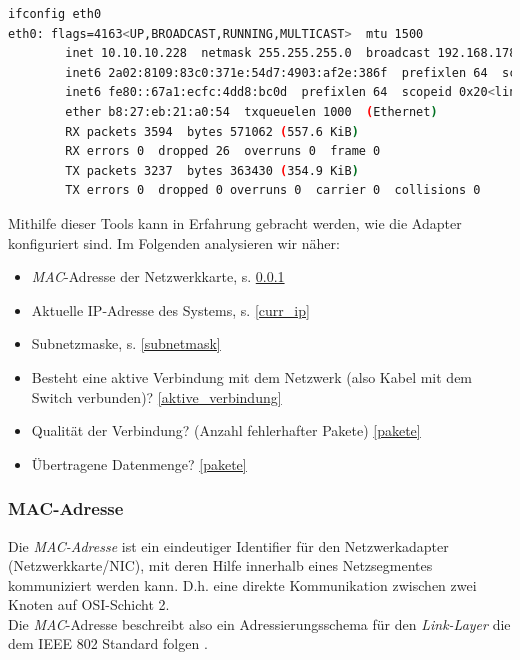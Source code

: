 \documentclass[paper=a4,fontsize=11pt]{scrartcl}%
\numberwithin{equation}{section}
\begin{document}
\begin{lstlisting}[style=Bash, language=Bash, label=ifconfig]
ifconfig eth0
eth0: flags=4163<UP,BROADCAST,RUNNING,MULTICAST>  mtu 1500
        inet 10.10.10.228  netmask 255.255.255.0  broadcast 192.168.178.255
        inet6 2a02:8109:83c0:371e:54d7:4903:af2e:386f  prefixlen 64  scopeid 0x0<global>
        inet6 fe80::67a1:ecfc:4dd8:bc0d  prefixlen 64  scopeid 0x20<link>
        ether b8:27:eb:21:a0:54  txqueuelen 1000  (Ethernet)
        RX packets 3594  bytes 571062 (557.6 KiB)
        RX errors 0  dropped 26  overruns 0  frame 0
        TX packets 3237  bytes 363430 (354.9 KiB)
        TX errors 0  dropped 0 overruns 0  carrier 0  collisions 0
\end{lstlisting}
Mithilfe dieser Tools kann in Erfahrung gebracht werden, wie die Adapter konfiguriert sind. Im Folgenden analysieren wir näher:
\begin{itemize}
		\item \emph{MAC}-Adresse der Netzwerkkarte, s. \ref{mac_addr}
		\item Aktuelle IP-Adresse des Systems, s. \ref{curr_ip}
		\item Subnetzmaske, s. \ref{subnetmask}
		\item Besteht eine aktive Verbindung mit dem Netzwerk (also Kabel mit dem Switch verbunden)? \ref{aktive_verbindung}
		\item Qualität der Verbindung? (Anzahl fehlerhafter Pakete) \ref{pakete}
		\item Übertragene Datenmenge? \ref{pakete}
\end{itemize}

\subsubsection{MAC-Adresse} \label{mac_addr}
Die \emph{\ac{MAC}-Adresse} ist ein eindeutiger Identifier für den Netzwerkadapter (Netzwerkkarte/\ac{NIC}), mit deren Hilfe innerhalb eines Netzsegmentes kommuniziert werden kann. D.h. eine direkte Kommunikation zwischen zwei Knoten auf \acs{OSI}-Schicht 2.\\
Die \emph{MAC}-Adresse beschreibt also ein Adressierungsschema für den \emph{Link-Layer} die dem \ac{IEEE} 802 Standard folgen \cite{IEEE802}.\\
\end{document}
